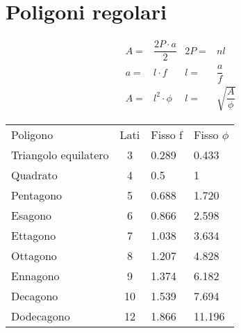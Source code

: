 \section{Poligoni regolari}
\begin{tcolorbox}[sidebyside,righthand width=9cm,colback=white,colframe=white,fonttitle=\bfseries	]
	
	\tcblower
	\begin{align}
	A=&\dfrac{2P\cdot a}{2} & 2P=&nl	\\
	a=&l\cdot f & l=&\dfrac{a}{f}	\\
	A=&l^2\cdot\phi&l=&\sqrt{\dfrac{A}{\phi}}
	\end{align}
\end{tcolorbox}
\begin{center}
	\begin{tabular}{lcll}
		\toprule
Poligono	&  Lati&  Fisso f&Fisso $\phi$ \\ 
Triangolo equilatero	& 3 & 0.289 &0.433\\ 
Quadrato	& 4 & 0.5&1 \\ 
Pentagono	& 5 &0.688 &1.720 \\ 
Esagono	& 6 &0.866 &2.598 \\ 
Ettagono	& 7 &1.038&3.634 \\ 
Ottagono	& 8 &1.207&4.828 \\ 
Ennagono	& 9&  1.374&6.182\\ 
Decagono	& 10 & 1.539&7.694 \\ 
Dodecagono	&  12&  1.866&11.196\\ 
\bottomrule
\end{tabular}
\end{center}
